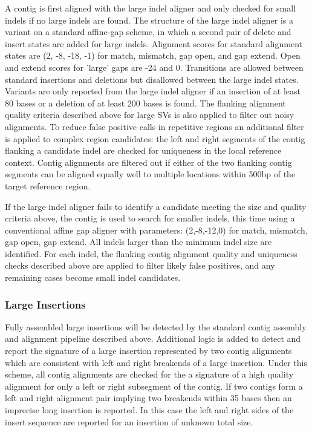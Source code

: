 \documentclass{article}
\begin{document}
A contig is first aligned with the large indel aligner and only checked for small indels if no large indels are found. The structure of the large indel aligner is a variant on a standard affine-gap scheme, in which a second pair of delete and insert states are added for large indels. Alignment scores for standard alignment states are (2, -8, -18, -1) for match, mismatch, gap open, and gap extend. Open and extend scores for 'large' gaps are -24 and 0. Transitions are allowed between standard insertions and deletions but disallowed between the large indel states. Variants are only reported from the large indel aligner if an insertion of at least 80 bases or a deletion of at least 200 bases is found. The flanking alignment quality criteria described above for large SVs is also applied to filter out noisy alignments. To reduce false positive calls in repetitive regions an additional filter is applied to complex region candidates: the left and right segments of the contig flanking a candidate indel are checked for uniqueness in the local reference context. Contig alignments are filtered out if either of the two flanking contig segments can be aligned equally well to multiple locations within 500bp of the target reference region.

If the large indel aligner fails to identify a candidate meeting the size and quality criteria above, the contig is used to search for smaller indels, this time using a conventional affine gap aligner with parameters: (2,-8,-12,0) for match, mismatch, gap open, gap extend. All indels larger than the minimum indel size are identified. For each indel, the flanking contig alignment quality and uniqueness checks described above are applied to filter likely false positives, and any remaining cases become small indel candidates.

\subsubsection{Large Insertions}

Fully assembled large insertions will be detected by the standard contig assembly and alignment pipeline described above. Additional logic is added to detect and report the signature of a large insertion represented by two contig alignments which are consistent with left and right breakends of a large insertion. Under this scheme, all contig alignments are checked for the a signature of a high quality alignment for only a left or right subsegment of the contig. If two contigs form a left and right alignment pair implying two breakends within 35 bases then an imprecise long insertion is reported. In this case the left and right sides of the insert sequence are reported for an insertion of unknown total size.
\end{document}
